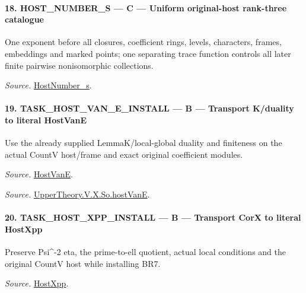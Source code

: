 \paragraph{18. HOST\_\allowbreak NUMBER\_\allowbreak S — C — Uniform original-host rank-three catalogue}

One exponent before all closures, coefficient rings, levels, characters, frames, embeddings and marked points; one separating trace function controls all later finite pairwise nonisomorphic collections.

\emph{Source.} \href{https://github.com/CocoSgt/riemann-hypothesis-lean/blob/7cbf7a0c32fca1badf05931879a37c3f8a2b03b4/src/Development/AutomorphicArithmetic/AutomorphicVarieties/ModularityArgument/ThresholdArguments/DenseThresholdCases/HostNumberS.lean#L18-L28}{HostNumber\_\allowbreak s}.



\paragraph{19. TASK\_\allowbreak HOST\_\allowbreak VAN\_\allowbreak E\_\allowbreak INSTALL — B — Transport K/duality to literal HostVanE}

Use the already supplied LemmaK/local-global duality and finiteness on the actual CountV host/frame and exact original coefficient modules.

\emph{Source.} \href{https://github.com/CocoSgt/riemann-hypothesis-lean/blob/7cbf7a0c32fca1badf05931879a37c3f8a2b03b4/src/Development/AutomorphicArithmetic/AutomorphicVarieties/UnitaryThreeDeformations/HostNumber.lean#L9-L12}{HostVanE}.

\emph{Source.} \href{https://github.com/CocoSgt/riemann-hypothesis-lean/blob/7cbf7a0c32fca1badf05931879a37c3f8a2b03b4/src/Development/AutomorphicArithmetic/AutomorphicVarieties/LevelCohomology/SoHostVanE.lean#L11-L18}{UpperTheory.V.X.So.hostVanE}.



\paragraph{20. TASK\_\allowbreak HOST\_\allowbreak XPP\_\allowbreak INSTALL — B — Transport CorX to literal HostXpp}

Preserve Psi\textasciicircum{}-2 eta, the prime-to-ell quotient, actual local conditions and the original CountV host while installing BR7.

\emph{Source.} \href{https://github.com/CocoSgt/riemann-hypothesis-lean/blob/7cbf7a0c32fca1badf05931879a37c3f8a2b03b4/src/Development/AutomorphicArithmetic/AutomorphicVarieties/UnitaryThreeDeformations/HostNumber.lean#L14-L17}{HostXpp}.

